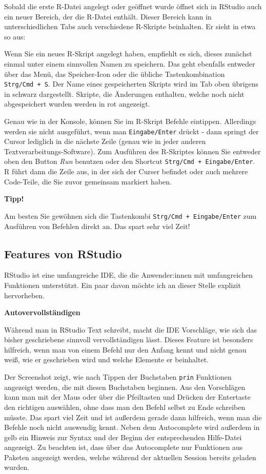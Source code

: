 \documentclass[
]{book}
\begin{document}
Sobald die erste R-Datei angelegt oder geöffnet wurde öffnet sich in RStudio auch ein neuer Bereich, der die R-Datei enthält. Dieser Bereich kann in unterschiedlichen Tabs auch verschiedene R-Skripte beinhalten. Er sieht in etwa so aus:

Wenn Sie ein neues R-Skript angelegt haben, empfiehlt es sich, dieses zunächst einmal unter einem sinnvollen Namen zu speichern. Das geht ebenfalls entweder über das Menü, das Speicher-Icon oder die übliche Tastenkombination \texttt{Strg/Cmd\ +\ S}. Der Name eines gespeicherten Skripts wird im Tab oben übrigens in schwarz dargestellt. Skripte, die Änderungen enthalten, welche noch nicht abgespeichert wurden werden in rot angezeigt.

Genau wie in der Konsole, können Sie im R-Skript Befehle eintippen. Allerdings werden sie nicht ausgeführt, wenn man \texttt{Eingabe/Enter} drückt - dann springt der Cursor lediglich in die nächste Zeile (genau wie in jeder anderen Textverarbeitungs-Software). Zum Ausführen des R-Skriptes können Sie entweder oben den Button \emph{Run} benutzen oder den Shortcut \texttt{Strg/Cmd\ +\ Eingabe/Enter}. R führt dann die Zeile aus, in der sich der Curser befindet oder auch mehrere Code-Teile, die Sie zuvor gemeinsam markiert haben.

\textbf{Tipp!}

Am besten Sie gewöhnen sich die Tastenkombi \texttt{Strg/Cmd\ +\ Eingabe/Enter} zum Ausführen von Befehlen direkt an. Das spart sehr viel Zeit!

\hypertarget{features-von-rstudio}{%
\subsection{Features von RStudio}\label{features-von-rstudio}}

RStudio ist eine umfangreiche IDE, die die Anwender:innen mit umfangreichen Funktionen unterstützt. Ein paar davon möchte ich an dieser Stelle explizit hervorheben.

\textbf{Autovervollständigen}

Während man in RStudio Text schreibt, macht die IDE Vorschläge, wie sich das bisher geschriebene sinnvoll vervollständigen lässt. Dieses Feature ist besonders hilfreich, wenn man von einem Befehl nur den Anfang kennt und nicht genau weiß, wie er geschrieben wird und welche Elemente er beinhaltet.

Der Screenshot zeigt, wie nach Tippen der Buchstaben \texttt{prin} Funktionen angezeigt werden, die mit diesen Buchstaben beginnen. Aus den Vorschlägen kann man mit der Maus oder über die Pfeiltasten und Drücken der Entertaste den richtigen auswählen, ohne dass man den Befehl selbst zu Ende schreiben müsste. Das spart viel Zeit und ist außerdem gerade dann hilfreich, wenn man die Befehle noch nicht auswendig kennt. Neben dem Autocomplete wird außerdem in gelb ein Hinweis zur Syntax und der Beginn der entsprechenden Hilfe-Datei angezeigt. Zu beachten ist, dass über das Autocomplete nur Funktionen aus Paketen angezeigt werden, welche während der aktuellen Session bereits geladen wurden.
\end{document}
